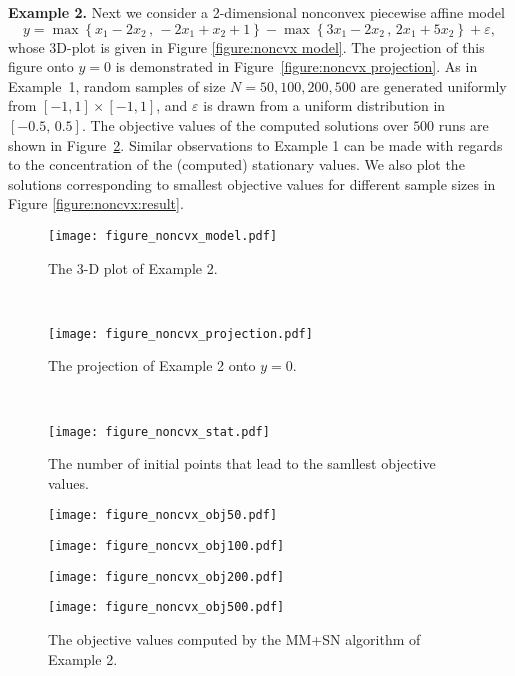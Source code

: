 \documentclass{siamart}
\begin{document}
\noindent
{\bf Example 2.} Next we consider a 2-dimensional nonconvex piecewise affine model
$$
y = \max\left\{x_1-2x_2\,,\, -2x_1+ x_2 + 1\right\} - \max\left\{3x_1-2x_2\,,\, 2x_1+5x_2\right\} + \varepsilon,
$$
whose 3D-plot is given in Figure \ref{figure:noncvx model}. The projection of this figure onto $y = 0$ is demonstrated in
Figure~\ref{figure:noncvx projection}.  As in Example~1, random samples of size $N = 50, 100, 200, 500$ are generated
uniformly from $[-1,1]\times [-1,1]$, and $\varepsilon$ is drawn from a uniform distribution in $[-0.5,\, 0.5]$.
The objective values of the computed solutions over $500$ runs are shown in Figure~\ref{figure:noncvx obj}.
Similar observations to Example 1 can be made with regards to the concentration of the (computed) stationary values.
We also  plot the solutions corresponding to smallest objective values for different sample sizes in Figure \ref{figure:noncvx:result}.

\begin{figure}[H]
\begin{center}
\begin{minipage}{.3\textwidth}
\centering
\texttt{[image: figure\_noncvx\_model.pdf]}
\caption{\scriptsize{The 3-D plot of Example 2.}}
\label{figure:noncvx model}
\end{minipage}
\;\,
\begin{minipage}{.3\textwidth}
\centering
\texttt{[image: figure\_noncvx\_projection.pdf]}
\caption{\scriptsize{The projection of Example 2 onto $y=0$.}}
\label{figure:noncvx projection}
\end{minipage}
\;\,
\begin{minipage}{.3\textwidth}
\centering
\texttt{[image: figure\_noncvx\_stat.pdf]}
\caption{\scriptsize{The number of initial points that lead to the samllest objective values.}}
\label{figure:noncvx landscape}
\end{minipage}
\end{center}
\end{figure}


\begin{figure}[H]
\begin{minipage}{.25\textwidth}
\centering
\texttt{[image: figure\_noncvx\_obj50.pdf]}
\end{minipage}%
\begin{minipage}{.25\textwidth}
\centering
\texttt{[image: figure\_noncvx\_obj100.pdf]}
\end{minipage}%
\begin{minipage}{.25\textwidth}
\centering
\texttt{[image: figure\_noncvx\_obj200.pdf]}
\end{minipage}%
\begin{minipage}{.25\textwidth}
\centering
\texttt{[image: figure\_noncvx\_obj500.pdf]}
\end{minipage}%
\caption{\small{The objective values computed by the MM+SN algorithm of Example 2.}}
\label{figure:noncvx obj}
\end{figure}
\end{document}
